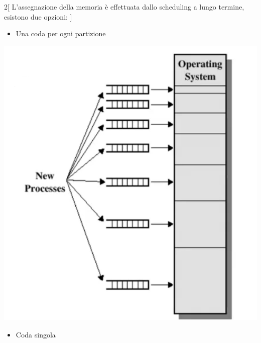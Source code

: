 \documentclass[a4paper,12pt, twoside]{report}
\begin{document}
\begin{multicols}{2}[
L'assegnazione della memoria \`e effettuata dallo scheduling a lungo termine, esistono due 
opzioni: ]

    \begin{itemize}
        \item Una coda per ogni partizione
    \end{itemize}
    \includegraphics[scale=0.2]{multiQueue}
    \begin{itemize} 
        \item Coda singola 
    \end{itemize}


\end{multicols}
\end{document}
